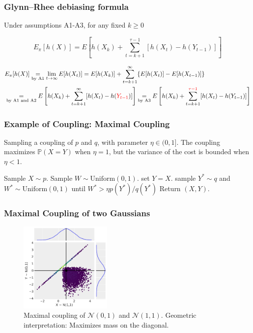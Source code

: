 \documentclass[aspectratio=169]{beamer}
\begin{document}
\begin{frame}
	\frametitle{Glynn--Rhee debiasing formula}
	\begin{theorem}
		Under assumptions A1-A3, for any fixed $k \geq 0$

		\[
			E_\pi[h(X)]  =E[h(X_k) + \sum_{t=k+1}^{\tau-1} [h(X_t) - h(Y_{t-1})] ]
		\]
	\end{theorem}

	\begin{align*}
		 & E_\pi[h(X)] \underset{\text{by A1}}{=} \lim_{t \to \infty} E[h(X_t)] = E[h(X_k)] + \sum_{t=k+1}^{\infty} \{E[h(X_t)] - E[h(X_{t-1})]\} \\
		 & \underset{\text{by A1 and A2}}{=} E\left[h(X_k) + \sum_{t=k+1}^{\infty} [h(X_t) - h(\textcolor{red}{Y_{t-1}})]\right]
		\underset{\text{by A3}}{=} E\left[h(X_k) + \sum_{t=k+1}^{\textcolor{red}{\tau-1}} [h(X_t) - h(Y_{t-1})]\right]
	\end{align*}

\end{frame}

\begin{frame}
	\frametitle{Example of Coupling: Maximal Coupling}
	\begin{algorithm}[H]
		\caption{Sampling a coupling of $p$ and $q$, with parameter $\eta \in (0, 1]$. The coupling maximizes $\mathbb{P}(X = Y)$ when $\eta = 1$, but the variance of the cost is bounded when $\eta < 1$.}
		\begin{algorithmic}[1]
			\STATE Sample $X \sim p$.
			\STATE Sample $W \sim \text{Uniform}(0, 1)$.
			\STATE set $Y = X$.
			\ELSE
			\STATE sample $Y^* \sim q$ and $W^* \sim \text{Uniform}(0, 1)$ until $W^* > \eta p(Y^*)/q(Y^*)$
			\ENDWHILE
			\ENDIF
			\STATE Return $(X, Y)$.
		\end{algorithmic}
	\end{algorithm}
\end{frame}

\begin{frame}
	\frametitle{Maximal Coupling of two Gaussians}
	\begin{figure}[h]
		\centering
		\includegraphics[width=0.4\textwidth]{maximal_coupling_plot.pdf}
		\caption{Maximal coupling of $\mathcal{N}(0, 1)$ and $\mathcal{N}(1, 1)$. Geometric interpretation: Maximizes mass on the diagonal.}
	\end{figure}
\end{frame}
\end{document}
